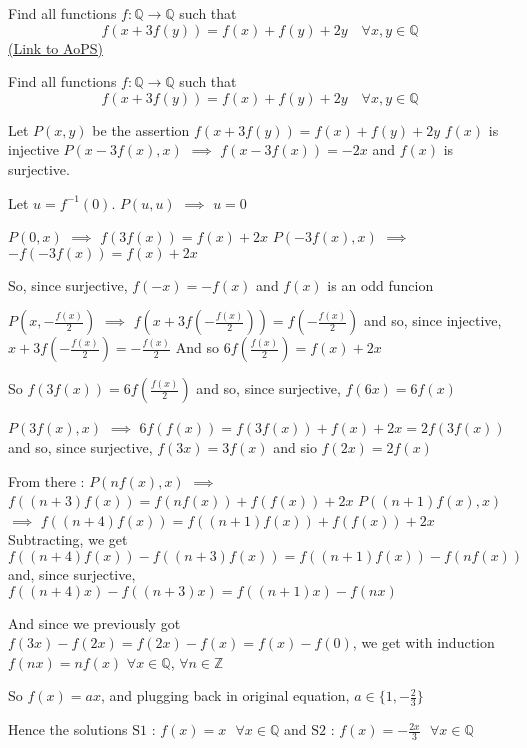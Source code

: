 \begin{problem}
	Find all functions $f:\mathbb{Q}\to \mathbb{Q}$ such that 
\[ f(x+3f(y))=f(x)+f(y)+2y \quad \forall x,y\in \mathbb{Q}\]
	\flushright \href{https://artofproblemsolving.com/community/c6h593734}{(Link to AoPS)}
\end{problem}



\begin{solution}
	\begin{tcolorbox}Find all functions $f:\mathbb{Q}\to \mathbb{Q}$ such that 
\[ f(x+3f(y))=f(x)+f(y)+2y \quad \forall x,y\in \mathbb{Q}\]\end{tcolorbox}
Let $P(x,y)$ be the assertion $f(x+3f(y))=f(x)+f(y)+2y$
$f(x)$ is injective
$P(x-3f(x),x)$ $\implies$ $f(x-3f(x))=-2x$ and $f(x)$ is surjective.

Let $u=f^{-1}(0)$. $P(u,u)$ $\implies$ $u=0$

$P(0,x)$ $\implies$ $f(3f(x))=f(x)+2x$
$P(-3f(x),x)$ $\implies$ $-f(-3f(x))=f(x)+2x$

So, since surjective, $f(-x)=-f(x)$ and $f(x)$ is an odd funcion


$P(x,-\frac{f(x)}2)$ $\implies$ $f(x+3f(-\frac{f(x)}2))=f(-\frac{f(x)}2)$ and so, since injective,  $x+3f(-\frac{f(x)}2)=-\frac{f(x)}2$
And so $6f(\frac{f(x)}2)=f(x)+2x$

So $f(3f(x))=6f(\frac{f(x)}2)$ and so, since surjective,  $f(6x)=6f(x)$ 

$P(3f(x),x)$ $\implies$ $6f(f(x))=f(3f(x))+f(x)+2x=2f(3f(x))$ and so, since surjective, $f(3x)=3f(x)$ and sio $f(2x)=2f(x)$

From there :
$P(nf(x),x)$ $\implies$ $f((n+3)f(x))=f(nf(x))+f(f(x))+2x$
$P((n+1)f(x),x)$ $\implies$ $f((n+4)f(x))=f((n+1)f(x))+f(f(x))+2x$
Subtracting, we get $f((n+4)f(x))-f((n+3)f(x))=f((n+1)f(x))-f(nf(x))$ and, since surjective, $f((n+4)x)-f((n+3)x)=f((n+1)x)-f(nx)$

And since we previously got $f(3x)-f(2x)=f(2x)-f(x)=f(x)-f(0)$, we get with induction $f(nx)=nf(x)$ $\forall x\in\mathbb Q$, $\forall n\in\mathbb Z$

So $f(x)=ax$, and plugging back in original equation, $a\in\{1,-\frac 23\}$

Hence the solutions $\boxed{\text{S1 : }f(x)=x\text{   }\forall x\in\mathbb Q}$ and $\boxed{\text{S2 : }f(x)=-\frac{2x}3\text{   }\forall x\in\mathbb Q}$
\end{solution}



